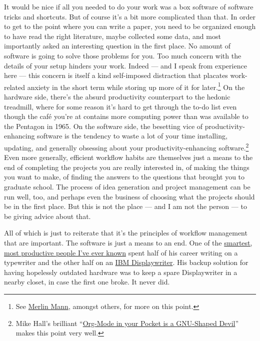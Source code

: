 \documentclass[11pt,article,oneside]{memoir}
\begin{document}
It would be nice if all you needed to do your work was a box software
of software tricks and shortcuts. But of course it's a bit more
complicated than that. In order to get to the point where you can
write a paper, you need to be organized enough to have read the right
literature, maybe collected some data, and most importantly asked an
interesting question in the first place. No amount of software is
going to solve those problems for you. Too much concern with the
details of your setup hinders your work. Indeed --- and I speak from
experience here --- this concern is itself a kind self-imposed
distraction that placates work-related anxiety in the short term while
storing up more of it for later.\footnote{See
  \href{http://inboxzero.com/}{Merlin Mann}, amongst others, for more
  on this point. } On the hardware side, there's the absurd
productivity counterpart to the hedonic treadmill, where for some
reason it's hard to get through the to-do list even though the café
you're at contains more computing power than was available to the
Pentagon in 1965. On the software side, the besetting vice of
productivity-enhancing software is the tendency to waste a lot of your
time installing, updating, and generally obsessing about your
productivity-enhancing software.\footnote{Mike Hall's brilliant
  ``\href{http://mph.puddingbowl.org/2010/02/org-mode-in-your-pocket-is-a-gnu-shaped-devil/}{Org-Mode
    in your Pocket is a GNU-Shaped Devil}'' makes this point very
  well. } Even more generally, efficient workflow habits are
themselves just a means to the end of completing the projects you are
really interested in, of making the things you want to make, of
finding the answers to the questions that brought you to graduate
school. The process of idea generation and project management can be
run well, too, and perhaps even the business of choosing what the
projects should be in the first place. But this is not the place ---
and I am not the person --- to be giving advice about that.

All of which is just to reiterate that it's the principles of workflow
management that are important. The software is just a means to an
end. One of the
\href{http://en.wikipedia.org/wiki/David_Kellogg_Lewis}{smartest, most
  productive people I've ever known} spent half of his career writing
on a typewriter and the other half on an
\href{http://www-03.ibm.com/ibm/history/exhibits/pc/pc_8.html}{IBM
  Displaywriter}. His backup solution for having hopelessly outdated
hardware was to keep a spare Displaywriter in a nearby closet, in case
the first one broke. It never did.

\printbibliography
\end{document}
